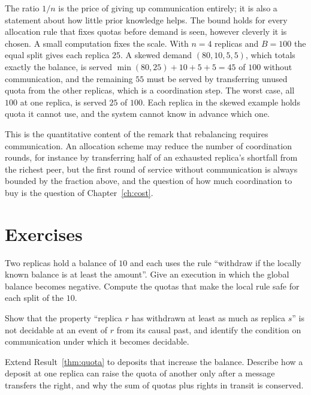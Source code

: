 The ratio $1/n$ is the price of giving up communication entirely; it is also a statement about how little prior knowledge helps. The bound holds for every allocation rule that fixes quotas before demand is seen, however cleverly it is chosen. A small computation fixes the scale. With $n=4$ replicas and $B=100$ the equal split gives each replica $25$. A skewed demand $(80,10,5,5)$, which totals exactly the balance, is served $\min(80,25)+10+5+5=45$ of $100$ without communication, and the remaining $55$ must be served by transferring unused quota from the other replicas, which is a coordination step. The worst case, all $100$ at one replica, is served $25$ of $100$. Each replica in the skewed example holds quota it cannot use, and the system cannot know in advance which one.

This is the quantitative content of the remark that rebalancing requires communication. An allocation scheme may reduce the number of coordination rounds, for instance by transferring half of an exhausted replica's shortfall from the richest peer, but the first round of service without communication is always bounded by the fraction above, and the question of how much coordination to buy is the question of Chapter~\ref{ch:cost}.

\section*{Exercises}

\begin{exercise}
Two replicas hold a balance of $10$ and each uses the rule ``withdraw if the locally known balance is at least the amount''. Give an execution in which the global balance becomes negative. Compute the quotas that make the local rule safe for each split of the $10$.
\end{exercise}

\begin{exercise}
Show that the property ``replica $r$ has withdrawn at least as much as replica $s$'' is not decidable at an event of $r$ from its causal past, and identify the condition on communication under which it becomes decidable.
\end{exercise}

\begin{exercise}
Extend Result~\ref{thm:quota} to deposits that increase the balance. Describe how a deposit at one replica can raise the quota of another only after a message transfers the right, and why the sum of quotas plus rights in transit is conserved.
\end{exercise}

